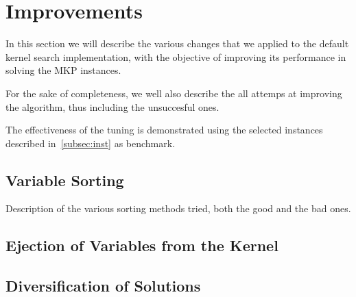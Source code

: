 \chapter{Improvements}

In this section we will describe the various changes
that we applied to the default kernel search implementation,
with the objective of improving its performance
in solving the MKP instances.

For the sake of completeness, we well also describe the all attemps at improving
the algorithm, thus including the unsuccesful ones.

The effectiveness of the tuning is demonstrated using the selected instances
described in~\ref{subsec:inst} as benchmark.


\section{Variable Sorting}
Description of the various sorting methods tried, both the good and the bad ones.


\section{Ejection of Variables from the Kernel}


\section{Diversification of Solutions}